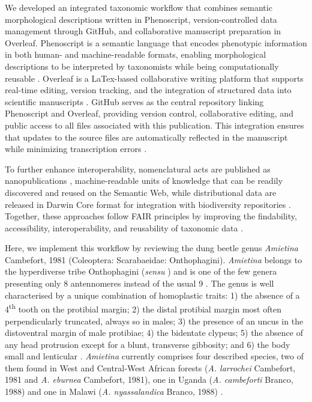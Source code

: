 We developed an integrated taxonomic workflow that combines semantic morphological descriptions written in Phenoscript, version-controlled data management through GitHub, and collaborative manuscript preparation in Overleaf. Phenoscript is a semantic language that encodes phenotypic information in both human- and machine-readable formats, enabling morphological descriptions to be interpreted by taxonomists while being computationally reusable \citep{montanaro2024beyond, montanaro2024computable}. Overleaf is a LaTex-based collaborative writing platform that supports real-time editing, version tracking, and the integration of structured data into scientific manuscripts \citep{sanchez_egea_garcia_vilana_gonzalez_rojas_napoles_alberro_2026}. GitHub serves as the central repository linking Phenoscript and Overleaf, providing version control, collaborative editing, and public access to all files associated with this publication. This integration ensures that updates to the source files are automatically reflected in the manuscript while minimizing transcription errors \citep{dabbish2012social}.

To further enhance interoperability, nomenclatural acts are published as nanopublications \citep{kuhn2017genuine, kuhn2013broadening, rossini2024towards}, machine-readable units of knowledge that can be readily discovered and reused on the Semantic Web, while distributional data are released in Darwin Core format for integration with biodiversity repositories \citep{wieczorek2012darwin}. Together, these approaches follow FAIR principles by improving the findability, accessibility, interoperability, and reusability of taxonomic data \citep{wilkinson2016fair}.

Here, we implement this workflow by reviewing the dung beetle genus \textit{Amietina} Cambefort, 1981 (Coleoptera: Scarabaeidae: Onthophagini). \textit{Amietina} belongs to the hyperdiverse tribe Onthophagini (\textit{sensu} \citealp{Montanaro2026.07.22.740134}) and is one of the few genera presenting only 8 antennomeres instead of the usual 9 \citep{branco1992essai, cambefort1981amietina, cambefort1979donnees, cambefort1986une, deschodt2023new}. The genus is well characterised by a unique combination of homoplastic traits: 1) the absence of a 4\textsuperscript{th} tooth on the protibial margin; 2) the distal protibial margin most often perpendicularly truncated, always so in males; 3) the presence of an uncus in the distoventral margin of male protibiae; 4) the bidentate clypeus; 5) the absence of any head protrusion except for a blunt, transverse gibbosity; and 6) the body small and lenticular \citep{branco1989deux, cambefort1981amietina}. \textit{Amietina} currently comprises four described species, two of them found in West and Central-West African forests (\textit{A. larrochei} Cambefort, 1981 and \textit{A. eburnea} Cambefort, 1981), one in Uganda (\textit{A. cambeforti} Branco, 1988) and one in Malawi (\textit{A. nyassalandica} Branco, 1988) \citep{branco1989deux, cambefort1981amietina}.

